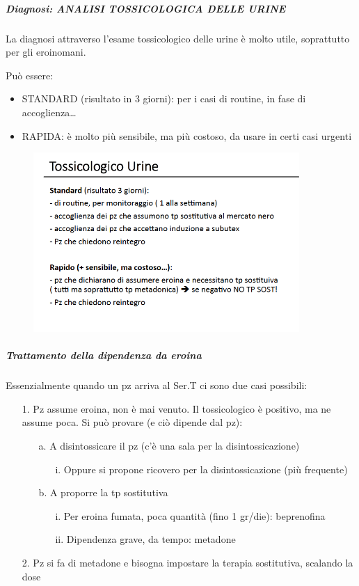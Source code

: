 \subparagraph{Diagnosi: ANALISI TOSSICOLOGICA DELLE URINE}

La diagnosi attraverso l'esame tossicologico delle urine è molto utile,
soprattutto per gli eroinomani.

Può essere:

\begin{itemize}
\item
  STANDARD (risultato in 3 giorni): per i casi di routine, in fase di accoglienza\ldots{}
\item
  RAPIDA: è molto più sensibile, ma più costoso, da usare in certi casi
  urgenti
\end{itemize}

\begin{figure}[!ht]
\centering
	\includegraphics[width=0.9\textwidth]{017/image11.png}
\end{figure}

\subparagraph{Trattamento della dipendenza da eroina}

Essenzialmente quando un pz arriva al Ser.T ci sono due casi possibili:

\begin{itemize}
\item[1.]
  Pz assume eroina, non è mai venuto. Il tossicologico è positivo, ma ne
  assume poca. Si può provare (e ciò dipende dal pz):
  \begin{itemize}
  \item[a.] A disintossicare il pz (c'è una sala per la disintossicazione)
    \begin{itemize}
    \item[i.]
      Oppure si propone ricovero per la disintossicazione (più
      frequente)
    \end{itemize}
  \item[b.]
    A proporre la tp sostitutiva
    \begin{itemize}
    \item[i.]
      Per eroina fumata, poca quantità (fino 1 gr/die): beprenofina
    \item[ii.]
      Dipendenza grave, da tempo: metadone
    \end{itemize}
  \end{itemize}
\item[2.]
  Pz si fa di metadone e bisogna impostare la terapia sostitutiva,
  scalando la dose
\end{itemize}

